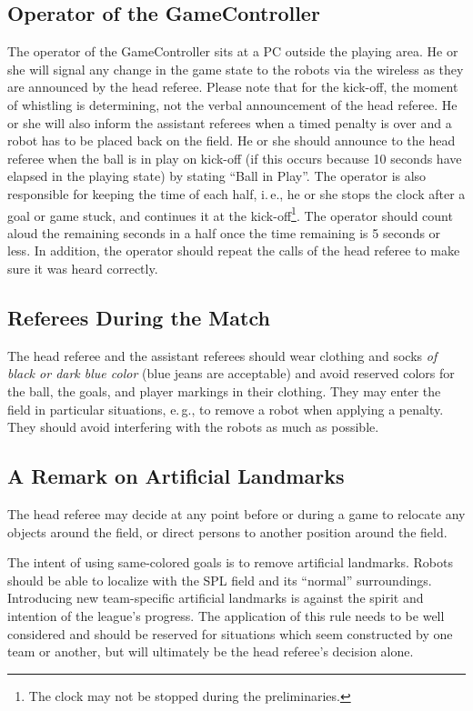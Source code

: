 \documentclass[12pt]{article}
\newcommand{\ie}{\mbox{i.\,e.}\xspace}
\newcommand{\eg}{\mbox{e.\,g.}\xspace}
\begin{document}
\subsection{Operator of the GameController}
\label{sec:gameControllerOp}
The operator of the GameController sits at a PC outside the playing area. He or she will signal any change in the game state to the robots via the wireless as they are announced by the head referee. Please note that for the kick-off, the moment of whistling is determining, not the verbal announcement of the head referee. He or she will also inform the assistant referees when a timed penalty is over and a robot has to be placed back on the field. He or she should announce to the head referee when the ball is in play on kick-off (if this occurs because 10 seconds have elapsed in the playing state) by stating ``Ball in Play''. The operator is also responsible for keeping the time of each half, \ie, he or she stops the clock after a goal or game stuck, and continues it at the kick-off\footnote{The clock may not be stopped during the preliminaries.}.  The operator should count aloud the remaining seconds in a half once the time remaining is 5 seconds or less. In addition, the operator should repeat the calls of the head referee to make sure it was heard correctly.

\subsection{Referees During the Match}

The head referee and the assistant referees should wear clothing and socks \emph{of black or dark blue color} (blue jeans are acceptable) and avoid reserved colors for the ball, the goals, and player markings in their clothing. They may enter the field in particular situations, \eg, to remove a robot when applying a penalty. They should avoid interfering with the robots as much as possible.

\subsection{A Remark on Artificial Landmarks}
\label{sec:judgment:landmarks}

The head referee may decide at any point before or during a game to relocate any objects around the field, or direct persons to another position around the field.

The intent of using same-colored goals is to remove artificial landmarks.
Robots should be able to localize with the SPL field and its ``normal'' surroundings.
Introducing new team-specific artificial landmarks is against the spirit and intention of the league's progress.
The application of this rule needs to be well considered and should be reserved for situations which seem constructed by one team or another, but will ultimately be the head referee's decision alone.
\end{document}
